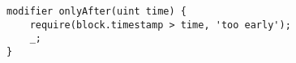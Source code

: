 \begin{lstlisting}[language=Solidity]
modifier onlyAfter(uint time) {
	require(block.timestamp > time, 'too early');
	_;
}
\end{lstlisting}
